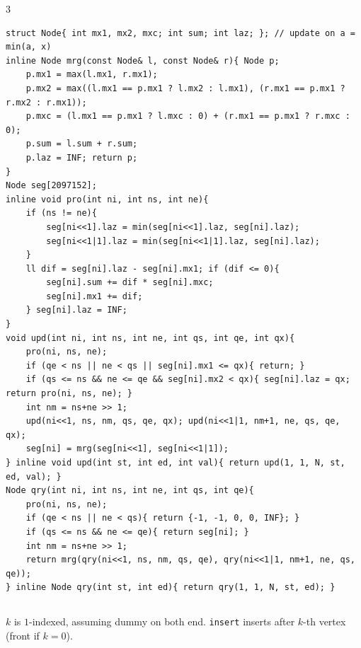 \documentclass[landscape, 8pt, a4paper, oneside]{extarticle}
\begin{document}
\begin{multicols*}{3}
\begin{verbatim}
struct Node{ int mx1, mx2, mxc; int sum; int laz; }; // update on a = min(a, x)
inline Node mrg(const Node& l, const Node& r){ Node p;
	p.mx1 = max(l.mx1, r.mx1);
	p.mx2 = max((l.mx1 == p.mx1 ? l.mx2 : l.mx1), (r.mx1 == p.mx1 ? r.mx2 : r.mx1));
	p.mxc = (l.mx1 == p.mx1 ? l.mxc : 0) + (r.mx1 == p.mx1 ? r.mxc : 0);
	p.sum = l.sum + r.sum;
	p.laz = INF; return p;
}
Node seg[2097152];
inline void pro(int ni, int ns, int ne){
	if (ns != ne){
		seg[ni<<1].laz = min(seg[ni<<1].laz, seg[ni].laz);
		seg[ni<<1|1].laz = min(seg[ni<<1|1].laz, seg[ni].laz);
	}
	ll dif = seg[ni].laz - seg[ni].mx1; if (dif <= 0){
		seg[ni].sum += dif * seg[ni].mxc;
		seg[ni].mx1 += dif;
	} seg[ni].laz = INF;
}
void upd(int ni, int ns, int ne, int qs, int qe, int qx){
	pro(ni, ns, ne);
	if (qe < ns || ne < qs || seg[ni].mx1 <= qx){ return; }
	if (qs <= ns && ne <= qe && seg[ni].mx2 < qx){ seg[ni].laz = qx; return pro(ni, ns, ne); }
	int nm = ns+ne >> 1;
	upd(ni<<1, ns, nm, qs, qe, qx); upd(ni<<1|1, nm+1, ne, qs, qe, qx);
	seg[ni] = mrg(seg[ni<<1], seg[ni<<1|1]);
} inline void upd(int st, int ed, int val){ return upd(1, 1, N, st, ed, val); }
Node qry(int ni, int ns, int ne, int qs, int qe){
	pro(ni, ns, ne);
	if (qe < ns || ne < qs){ return {-1, -1, 0, 0, INF}; }
	if (qs <= ns && ne <= qe){ return seg[ni]; }
	int nm = ns+ne >> 1;
	return mrg(qry(ni<<1, ns, nm, qs, qe), qry(ni<<1|1, nm+1, ne, qs, qe));
} inline Node qry(int st, int ed){ return qry(1, 1, N, st, ed); }
\end{verbatim}
\subsection{}
$k$ is $1$-indexed, assuming dummy on both end. \texttt{insert} inserts after $k$-th vertex (front if $k = 0$).


\end{multicols*}
\end{document}

